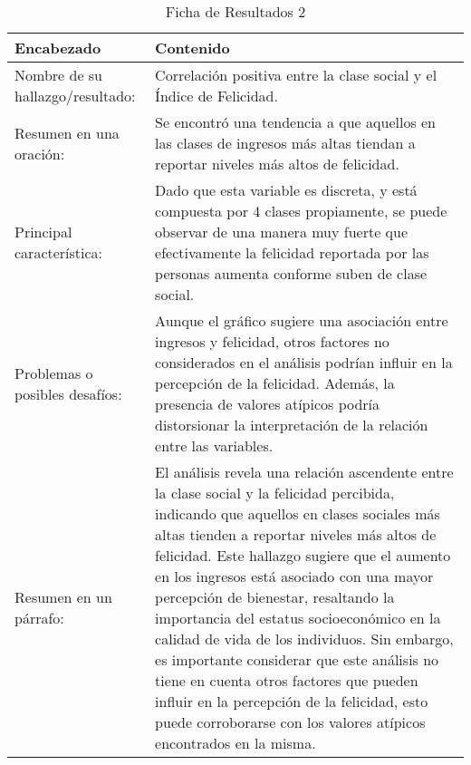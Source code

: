 \begin{table}[H]
    \caption{Ficha de Resultados 2}
    \begin{center}
        \begin{tabular}{  m{3cm} | m{12cm}  }
        \hline
        \textbf{ Encabezado} & \textbf{Contenido }\\ 
        \hline
        Nombre de su hallazgo/resultado: & Correlación positiva entre la clase social y el Índice de Felicidad.\\ 
        \hline
        Resumen en una oración: & Se encontró una tendencia a que aquellos en las clases de ingresos más altas tiendan a reportar niveles más altos de felicidad.\\ 
        \hline
        Principal característica: &  Dado que esta variable es discreta, y está compuesta por 4 clases propiamente, se puede observar de una manera muy fuerte que efectivamente la felicidad reportada por las personas aumenta conforme suben de clase social. \\ 
        \hline
        Problemas o posibles desafíos: &  Aunque el gráfico sugiere una asociación entre ingresos y felicidad, otros factores no considerados en el análisis podrían influir en la percepción de la felicidad. Además, la presencia de valores atípicos podría distorsionar la interpretación de la relación entre las variables. \\ 
        \hline
        Resumen en un párrafo: & El análisis revela una relación ascendente entre la clase social y la felicidad percibida, indicando que aquellos en clases sociales más altas tienden a reportar niveles más altos de felicidad. Este hallazgo sugiere que el aumento en los ingresos está asociado con una mayor percepción de bienestar, resaltando la importancia del estatus socioeconómico en la calidad de vida de los individuos. Sin embargo, es importante considerar que este análisis no tiene en cuenta otros factores que pueden influir en la percepción de la felicidad, esto puede corroborarse con los valores atípicos encontrados en la misma. \\ 
        \hline
        \end{tabular}
    \end{center}
\end{table}

